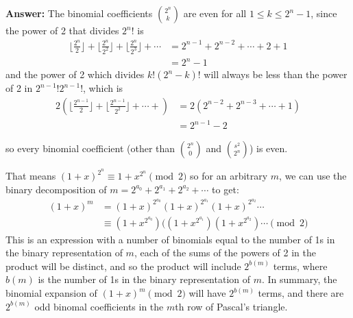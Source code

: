 \documentclass{article}
\begin{document}
\begin{enumerate}
    \textbf{Answer:} The binomial coefficients $\binom{2^n}{k}$ are even for all $1 \leq k \leq 2^n-1$, since the power of 2 that divides $2^n!$ is 
    \begin{align*}
    \lfloor \frac{2^n}{2} \rfloor + \lfloor \frac{2^n}{2^2} \rfloor + \lfloor \frac{2^n}{2^3} \rfloor + \cdots & = 2^{n-1} + 2^{n-2} + \cdots + 2 + 1 \\
    &= 2^n - 1
    \end{align*}
    and the power of 2 which divides $k!(2^n-k)!$ will always be less than the power of 2 in $2^{n-1}!2^{n-1}!$, which is
    \begin{align*}
        2 \left( \lfloor \frac{2^{n-1}}{2} \rfloor + \lfloor \frac{2^{n-1}}{2^2} \rfloor + \cdots + \right)  &= 2(2^{n-2} + 2^{n-3} + \cdots + 1) \\
        &= 2^{n-1}-2
    \end{align*}
    
    so every binomial coefficient (other than $\binom{2^n}{0}$ and $\binom{s^2}{2^n}$) is even.
    
    That means $(1+x)^{2^n} \equiv 1+x^{2^n} \pmod{2}$ so for an arbitrary $m$, we can use the binary decomposition of $m = 2^{a_0} + 2^{a_1} + 2^{a_2} + \cdots$ to get:
    \begin{align*}
        (1+x)^m &= (1+x)^{2^{a_0}}(1+x)^{2^{a_1}}(1+x)^{2^{a_2}}\cdots \\
        & \equiv (1+x^{2^{a_0}})((1+x^{2^{a_1}})(1+x^{2^{a_2}})\cdots \pmod{2}
    \end{align*}
    This is an expression with a number of binomials equal to the number of 1s in the binary representation of $m$, each of the sums of the powers of 2 in the product will be distinct, and so the product will include $2^{b(m)}$ terms, where $b(m)$ is the number of 1s in the binary representation of $m$. In summary, the binomial expansion of $(1+x)^m \pmod{2}$ will have $2^{b(m)}$ terms, and there are $2^{b(m)}$ odd binomal coefficients in the $m$th row of Pascal's triangle.
    
\end{enumerate}
\end{document}
